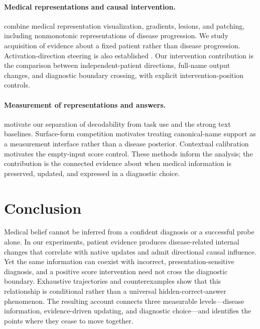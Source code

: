 \documentclass[11pt]{article}
\begin{document}
\paragraph{Medical representations and causal intervention.}
\citet{marinescu2025} combine medical representation visualization, gradients, lesions, and patching, including nonmonotonic representations of disease progression. We study acquisition of evidence about a fixed patient rather than disease progression. Activation-direction steering is also established \citep{iti}. Our intervention contribution is the comparison between independent-patient directions, full-name output changes, and diagnostic boundary crossing, with explicit intervention-position controls.

\paragraph{Measurement of representations and answers.}
\citet{probing,contextprobe} motivate our separation of decodability from task use and the strong text baselines. Surface-form competition \citep{surface} motivates treating canonical-name support as a measurement interface rather than a disease posterior. Contextual calibration \citep{calibrate} motivates the empty-input score control. These methods inform the analysis; the contribution is the connected evidence about when medical information is preserved, updated, and expressed in a diagnostic choice.

\section{Conclusion}
Medical belief cannot be inferred from a confident diagnosis or a successful probe alone. In our experiments, patient evidence produces disease-related internal changes that correlate with native updates and admit directional causal influence. Yet the same information can coexist with incorrect, presentation-sensitive diagnosis, and a positive score intervention need not cross the diagnostic boundary. Exhaustive trajectories and counterexamples show that this relationship is conditional rather than a universal hidden-correct-answer phenomenon. The resulting account connects three measurable levels---disease information, evidence-driven updating, and diagnostic choice---and identifies the points where they cease to move together.
\end{document}
